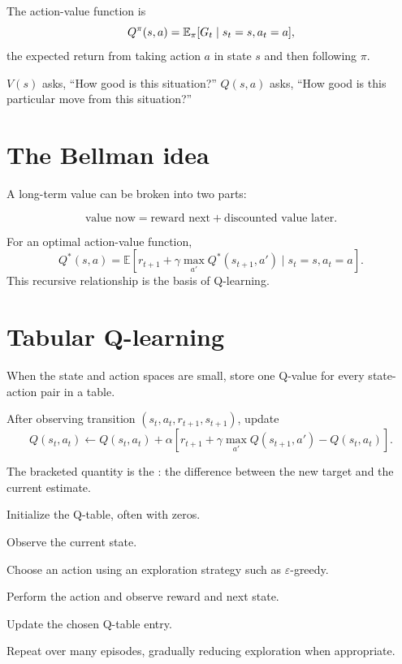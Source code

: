 The action-value function is
\[
  Q^{\pi}(s,a)=\mathbb{E}_{\pi}[G_t\mathrel{|} s_t=s,a_t=a],
\]
the expected return from taking action $a$ in state $s$ and then following $\pi$.

\begin{intuition}
$V(s)$ asks, ``How good is this situation?'' $Q(s,a)$ asks, ``How good is this particular move from this situation?''
\end{intuition}

\section{The Bellman idea}

A long-term value can be broken into two parts:

\[
\text{value now}=\text{reward next}+\text{discounted value later}.
\]

For an optimal action-value function,
\[
Q^*(s,a)=\mathbb{E}\left[r_{t+1}+\gamma\max_{a'}Q^*(s_{t+1},a')\mid s_t=s,a_t=a\right].
\]
This recursive relationship is the basis of Q-learning.

\section{Tabular Q-learning}

When the state and action spaces are small, store one Q-value for every state-action pair in a table.

After observing transition $(s_t,a_t,r_{t+1},s_{t+1})$, update
\[
Q(s_t,a_t)\leftarrow Q(s_t,a_t)+\alpha\left[r_{t+1}+\gamma\max_{a'}Q(s_{t+1},a')-Q(s_t,a_t)\right].
\]

The bracketed quantity is the : the difference between the new target and the current estimate.

\begin{mlsteps}
  \item Initialize the Q-table, often with zeros.
  \item Observe the current state.
  \item Choose an action using an exploration strategy such as $\varepsilon$-greedy.
  \item Perform the action and observe reward and next state.
  \item Update the chosen Q-table entry.
  \item Repeat over many episodes, gradually reducing exploration when appropriate.
\end{mlsteps}

